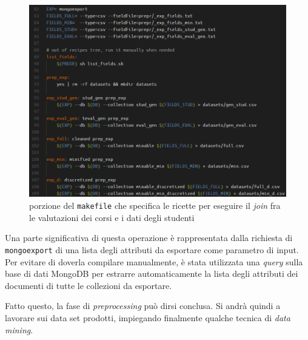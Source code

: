 	\begin{figure}
			\centering
			\caption{porzione del \texttt{makefile} che specifica le ricette per eseguire il \textit{join} fra le valutazioni dei corsi e i dati degli studenti}
			\label{make_export}
		\includegraphics[scale=0.35]{img/export.png}
	\end{figure}

	Una parte significativa di questa operazione è rappresentata dalla richiesta di \texttt{mongoexport} di una lista degli attributi da esportare come parametro di input. Per evitare di doverla compilare manualmente, è stata utilizzata una \textit{query} sulla base di dati MongoDB per estrarre automaticamente la lista degli attributi dei documenti di tutte le collezioni da esportare.


	

	\vspace{0.3cm}

	Fatto questo, la fase di \textit{preprocessing} può dirsi conclusa. Si andrà quindi a lavorare sui data set prodotti, impiegando finalmente qualche tecnica di \textit{data mining}.
